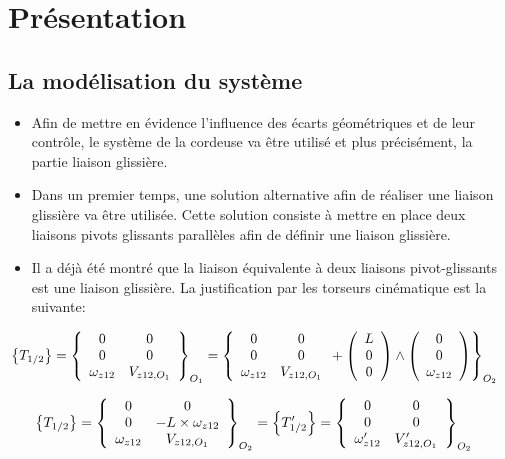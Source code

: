 

\section{Présentation}

\subsection{La modélisation du système}

\begin{itemize}
 \item Afin de mettre en évidence l'influence des écarts géométriques et de leur contrôle, le système de la cordeuse va être utilisé et plus précisément, la partie liaison glissière.
 \item Dans un premier temps, une solution alternative afin de réaliser une liaison glissière va être utilisée. Cette solution consiste à mettre en place deux liaisons pivots glissants parallèles afin de définir une liaison glissière.
 \item Il a déjà été montré que la liaison équivalente à deux liaisons pivot-glissants est une liaison glissière. La justification par les torseurs cinématique est la suivante:
\end{itemize}

\begin{eqnarray}
& \left\{T_{1/2}\right\}=\left\{\begin{array}{c c}
0 & 0 \\
0 & 0 \\
\omega_{z12} & V_{z12,O_{1}}
\end{array}\right\}_{O_{1}}=
\left\{\begin{array}{c c}
0 & 0 \\
0 & 0 \\
\omega_{z12} & V_{z12,O_{1}}
\end{array}+\left(\begin{array}{c}
L \\
0 \\
0
\end{array}\right)\wedge
\left(
\begin{array}{c}
0 \\
0 \\
\omega_{z12}
\end{array}\right)\right\}_{O_{2}} \nonumber
\end{eqnarray}

\begin{eqnarray}
& \left\{T_{1/2}\right\}=\left\{\begin{array}{c c}
0 & 0 \\
0 & - L \times \omega_{z12} \\
\omega_{z12} & V_{z12,O_{1}}
\end{array}\right\}_{O_{2}}=
\left\{T'_{1/2}\right\}=\left\{\begin{array}{c c}
0 & 0 \\
0 & 0 \\
\omega'_{z12} & V'_{z12,O_{1}}
\end{array}\right\}_{O_{2}} \nonumber
\end{eqnarray}

